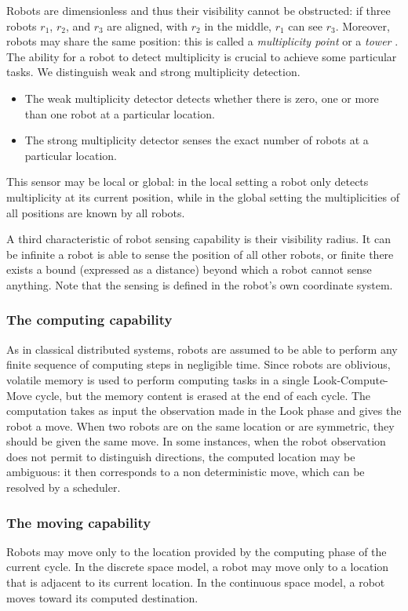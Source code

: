 Robots are dimensionless and thus their visibility cannot be obstructed:  if three robots $r_1$, $r_2$, and $r_3$ are aligned, with $r_2$ in the middle, $r_1$ can see $r_3$. Moreover, robots may share the same position: this is called a \emph{multiplicity point} or a \emph{tower} \cite{FPS12}. The ability for a robot to detect multiplicity is crucial to achieve some particular tasks. We distinguish weak and strong multiplicity detection. 
\begin{itemize}
\item The weak multiplicity detector detects whether there is zero, one or more than one robot at a particular location. 
\item The strong multiplicity detector senses the exact number of robots at a particular location. 
\end{itemize}
This sensor may be local or global: in the local setting a robot only detects multiplicity at its current position, while in the  global setting the multiplicities of all positions are known by all robots.

A third characteristic of robot sensing capability is their visibility radius. It can be infinite \ie a robot is able to sense the position of all other robots, or finite \ie there exists a bound (expressed as a distance) beyond which a robot cannot sense anything.
Note that the sensing is defined in the robot’s own coordinate system.

\subsubsection{The computing capability}
As in classical distributed systems, robots are assumed to be able to perform any finite sequence of computing steps in negligible time. 
Since robots are oblivious, volatile memory is used to perform computing tasks in a single Look-Compute-Move cycle, but the memory content is erased at the end of each cycle.
The computation takes as input the observation made in the Look phase and gives the robot a move.
When two robots are on the same location or are symmetric, they should be given the same move.
In some instances, when the robot observation does not permit to distinguish directions, the computed location may be ambiguous: it then corresponds to a non deterministic move, which can be resolved by a scheduler.

\subsubsection{The moving capability}
Robots may move only to the location provided by the computing phase of the current cycle.  
In the discrete space model, a robot may move only to a location that is adjacent to its current location. In the continuous space model, a robot moves toward its computed destination. %



